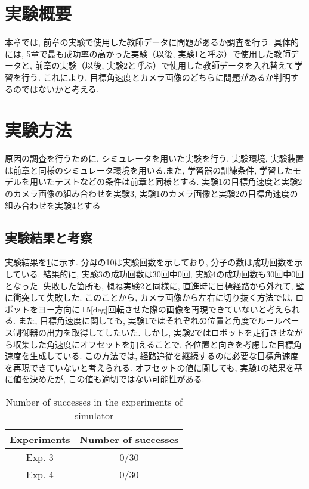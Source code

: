 
\section{実験概要}
本章では, 前章の実験で使用した教師データに問題があるか調査を行う. 具体的には, 5章で最も成功率の高かった実験（以後, 実験1と呼ぶ）で使用した教師データと, 前章の実験（以後, 実験2と呼ぶ）で使用した教師データを入れ替えて学習を行う. これにより, 目標角速度とカメラ画像のどちらに問題があるか判明するのではないかと考える. 

\section{実験方法}
原因の調査を行うために, シミュレータを用いた実験を行う. 実験環境, 実験装置は前章と同様のシミュレータ環境を用いる.また, 学習器の訓練条件, 学習したモデルを用いたテストなどの条件は前章と同様とする. 実験1の目標角速度と実験2のカメラ画像の組み合わせを実験3, 実験1のカメラ画像と実験2の目標角速度の組み合わせを実験4とする

\newpage
\subsection{実験結果と考察}
実験結果を\ref{tb:inves}に示す. 分母の10は実験回数を示しており, 分子の数は成功回数を示している. 結果的に, 実験3の成功回数は30回中0回, 実験4の成功回数も30回中0回となった. 失敗した箇所も, 概ね実験2と同様に, 直進時に目標経路から外れて, 壁に衝突して失敗した. このことから, カメラ画像から左右に切り抜く方法では, ロボットをヨー方向に±5[deg]回転させた際の画像を再現できていないと考えられる. また, 目標角速度に関しても, 実験1ではそれぞれの位置と角度でルールベース制御器の出力を取得してしたいた. しかし, 実験2ではロボットを走行させながら収集した角速度にオフセットを加えることで, 各位置と向きを考慮した目標角速度を生成している. この方法では, 経路追従を継続するのに必要な目標角速度を再現できていないと考えられる. オフセットの値に関しても, 実験1の結果を基に値を決めたが, この値も適切ではない可能性がある. 

\begin{table}[h]
  \centering
  \caption{Number of successes in the experiments of simulator}
  \begin{tabular}{|c|c|} \hline
      Experiments & Number of successes \\ \hline
      Exp. 3 & 0/30 \\ \hline
      Exp. 4 & 0/30 \\ \hline
    \end{tabular}
  \label{tb:inves}
\end{table}

